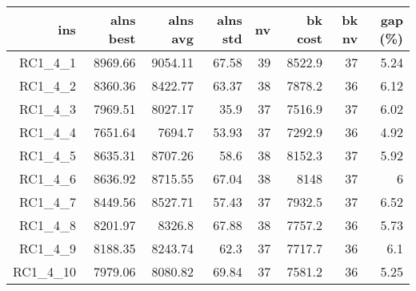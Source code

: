   \begin{table}[caption={Kết quả đo với tập HG\_RC\_1\_4 400 yêu cầu}, label=exp:HGRC14]
    \centering
    \begin{tabular}{rrrrrrrr}
    \hline
    ins & alns best & alns avg & alns std & nv & bk cost & bk nv & gap (\%) \\ \hline
    RC1\_4\_1 & 8969.66 & 9054.11 & 67.58 & 39 & 8522.9 & 37 & 5.24 \\ \hline
    RC1\_4\_2 & 8360.36 & 8422.77 & 63.37 & 38 & 7878.2 & 36 & 6.12 \\ \hline
    RC1\_4\_3 & 7969.51 & 8027.17 & 35.9 & 37 & 7516.9 & 37 & 6.02 \\ \hline
    RC1\_4\_4 & 7651.64 & 7694.7 & 53.93 & 37 & 7292.9 & 36 & 4.92 \\ \hline
    RC1\_4\_5 & 8635.31 & 8707.26 & 58.6 & 38 & 8152.3 & 37 & 5.92 \\ \hline
    RC1\_4\_6 & 8636.92 & 8715.55 & 67.04 & 38 & 8148 & 37 & 6 \\ \hline
    RC1\_4\_7 & 8449.56 & 8527.71 & 57.43 & 37 & 7932.5 & 37 & 6.52 \\ \hline
    RC1\_4\_8 & 8201.97 & 8326.8 & 67.88 & 38 & 7757.2 & 36 & 5.73 \\ \hline
    RC1\_4\_9 & 8188.35 & 8243.74 & 62.3 & 37 & 7717.7 & 36 & 6.1 \\ \hline
    RC1\_4\_10 & 7979.06 & 8080.82 & 69.84 & 37 & 7581.2 & 36 & 5.25 \\ \hline
    \end{tabular}
  \end{table}

